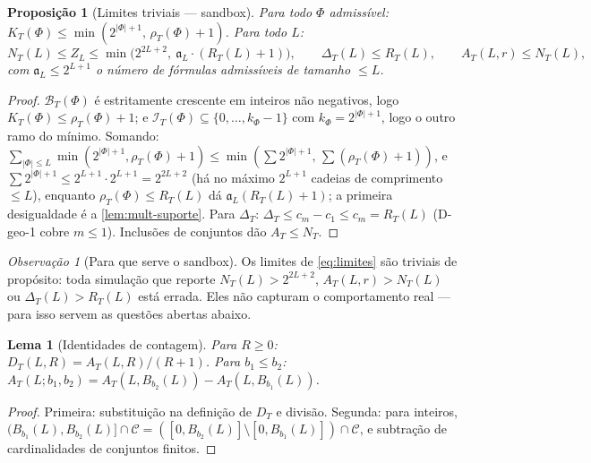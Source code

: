 \documentclass[11pt,a4paper]{article}
\newtheorem{lemma}[theorem]{Lema}
\newtheorem{proposition}[theorem]{Proposição}
\theoremstyle{definition}
\theoremstyle{remark}
\newtheorem*{remark}{Observação}
\begin{document}
\begin{proposition}[Limites triviais --- sandbox]\label{prop:limites}
Para todo $\Phi$ admissível:
$K_T(\Phi) \leq \min(2^{|\Phi|+1},\, \rho_T(\Phi)+1)$. Para todo $L$:
\begin{equation}\label{eq:limites}
  N_T(L) \leq Z_L \leq \min\bigl(2^{2L+2},\ \mathfrak{a}_L \cdot (R_T(L)+1)\bigr),
  \qquad
  \Delta_T(L) \leq R_T(L),
  \qquad
  A_T(L,r) \leq N_T(L),
\end{equation}
com $\mathfrak{a}_L \leq 2^{L+1}$ o número de fórmulas admissíveis de
tamanho $\leq L$.
\end{proposition}

\begin{proof}
$\mathcal{B}_T(\Phi)$ é estritamente crescente em inteiros não
negativos, logo $K_T(\Phi) \leq \rho_T(\Phi) + 1$; e
$\mathcal{I}_T(\Phi) \subseteq \{0,\dots,k_\Phi-1\}$ com
$k_\Phi = 2^{|\Phi|+1}$, logo o outro ramo do mínimo. Somando:
$\sum_{|\Phi| \leq L} \min(2^{|\Phi|+1}, \rho_T(\Phi)+1) \leq
\min(\sum 2^{|\Phi|+1},\, \sum (\rho_T(\Phi)+1))$, e $\sum
2^{|\Phi|+1} \leq 2^{L+1} \cdot 2^{L+1} = 2^{2L+2}$ (há no máximo
$2^{L+1}$ cadeias de comprimento $\leq L$), enquanto
$\rho_T(\Phi) \leq R_T(L)$ dá $\mathfrak{a}_L (R_T(L)+1)$; a
primeira desigualdade é a \cref{lem:mult-suporte}. Para $\Delta_T$:
$\Delta_T \leq c_m - c_1 \leq c_m = R_T(L)$ (D-geo-1 cobre $m \leq
1$). Inclusões de conjuntos dão $A_T \leq N_T$.
\end{proof}

\begin{remark}[Para que serve o sandbox]
Os limites de \eqref{eq:limites} são triviais de propósito: toda
simulação que reporte $N_T(L) > 2^{2L+2}$, $A_T(L,r) > N_T(L)$ ou
$\Delta_T(L) > R_T(L)$ está errada. Eles não capturam o comportamento
real --- para isso servem as questões abertas abaixo.
\end{remark}

\begin{lemma}[Identidades de contagem]\label{lem:identidades}
Para $R \geq 0$: $D_T(L,R) = A_T(L,R)/(R+1)$. Para $b_1 \leq b_2$:
$A_T(L;b_1,b_2) = A_T(L, B_{b_2}(L)) - A_T(L, B_{b_1}(L))$.
\end{lemma}

\begin{proof}
Primeira: substituição na definição de $D_T$ e divisão. Segunda:
para inteiros, $(B_{b_1}(L), B_{b_2}(L)] \cap \mathcal{C} =
([0, B_{b_2}(L)] \setminus [0, B_{b_1}(L)]) \cap \mathcal{C}$, e
subtração de cardinalidades de conjuntos finitos.
\end{proof}
\end{document}

